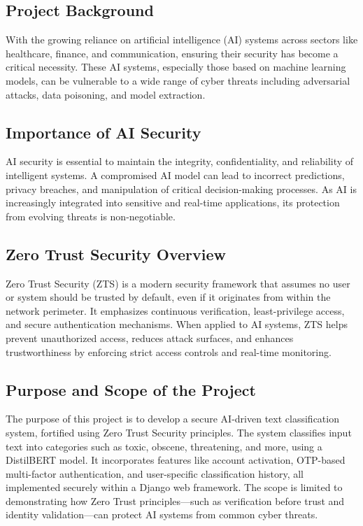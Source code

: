\documentclass[a4paper,12pt]{article}
\begin{document}
\subsection{Project Background}
With the growing reliance on artificial intelligence (AI) systems across sectors like healthcare, finance, and communication, ensuring their security has become a critical necessity. These AI systems, especially those based on machine learning models, can be vulnerable to a wide range of cyber threats including adversarial attacks, data poisoning, and model extraction.

\subsection{Importance of AI Security}
AI security is essential to maintain the integrity, confidentiality, and reliability of intelligent systems. A compromised AI model can lead to incorrect predictions, privacy breaches, and manipulation of critical decision-making processes. As AI is increasingly integrated into sensitive and real-time applications, its protection from evolving threats is non-negotiable.

\subsection{Zero Trust Security Overview}
Zero Trust Security (ZTS) is a modern security framework that assumes no user or system should be trusted by default, even if it originates from within the network perimeter. It emphasizes continuous verification, least-privilege access, and secure authentication mechanisms. When applied to AI systems, ZTS helps prevent unauthorized access, reduces attack surfaces, and enhances trustworthiness by enforcing strict access controls and real-time monitoring.

\subsection{Purpose and Scope of the Project}
The purpose of this project is to develop a secure AI-driven text classification system, fortified using Zero Trust Security principles. The system classifies input text into categories such as toxic, obscene, threatening, and more, using a DistilBERT model. It incorporates features like account activation, OTP-based multi-factor authentication, and user-specific classification history, all implemented securely within a Django web framework. The scope is limited to demonstrating how Zero Trust principles—such as verification before trust and identity validation—can protect AI systems from common cyber threats.
\end{document}
